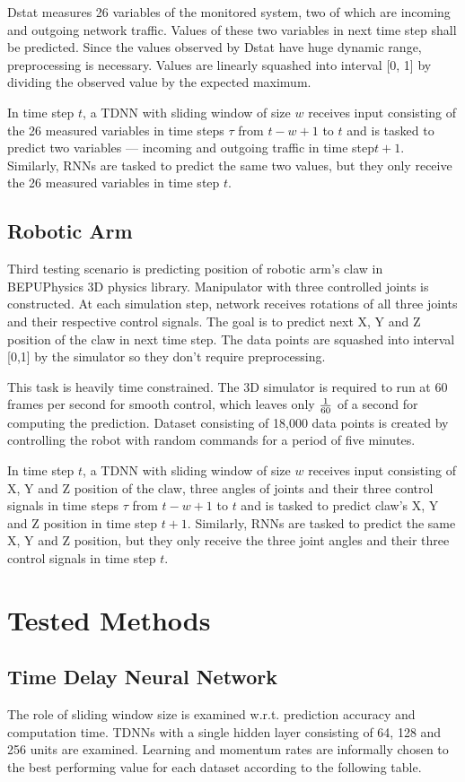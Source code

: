 \documentclass[12pt,oneside]{fithesis2}
\begin{document}
Dstat measures 26 variables of the monitored system, two of which are incoming and outgoing network traffic. Values of these two variables in next time step shall be predicted. Since the values observed by Dstat have huge dynamic range, preprocessing is necessary. Values are linearly squashed into interval [0, 1] by dividing the observed value by the expected maximum. \par
In time step $t$, a TDNN with sliding window of size $w$ receives input consisting of the 26 measured variables in time steps $\tau$ from $t-w+1$ to $t$ and is tasked to predict two variables --- incoming and outgoing traffic in time step$t+1$. Similarly, RNNs are tasked to predict the same two values, but they only receive the 26 measured variables in time step $t$.


\subsection{Robotic Arm}
Third testing scenario is predicting position of robotic arm's claw in BEPUPhysics 3D physics library. Manipulator with three controlled joints is constructed. At each simulation step, network receives rotations of all three joints and their respective control signals. The goal is to predict next X, Y and Z position of the claw in next time step. The data points are squashed into interval [0,1] by the simulator so they don't require preprocessing.\par
This task is heavily time constrained. The 3D simulator is required to run at 60 frames per second for smooth control, which leaves only $1 \over 60$ of a second for computing the prediction. Dataset consisting of 18,000 data points is created by controlling the robot with random commands for a period of five minutes. \par
In time step $t$, a TDNN with sliding window of size $w$ receives input consisting of X, Y and Z position of the claw, three angles of joints and their three control signals in time steps $\tau$ from $t-w+1$ to $t$ and is tasked to predict claw's X, Y and Z position in time step $t+1$. Similarly, RNNs are tasked to predict the same X, Y and Z position, but they only receive the three joint angles and their three control signals in time step $t$.

\section{Tested Methods}

\subsection{Time Delay Neural Network}
The role of sliding window size is examined w.r.t. prediction accuracy and computation time. TDNNs with a single hidden layer consisting of 64, 128 and 256 units are examined. Learning and momentum rates are informally chosen to the best performing value for each dataset according to the following table.
\end{document}
